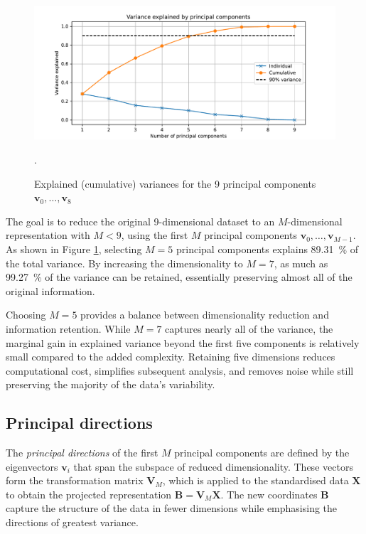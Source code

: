 \documentclass[dtu]{dtuarticle}
\begin{document}
	\begin{figure}[h!]
		\includegraphics[width=.9\textwidth]{figures/pca_explained_variance}
		\caption{Explained (cumulative) variances for the 9 principal components $\bm{v}_0,\ldots,\bm{v}_8$}.
		\label{fig:explained-var}
	\end{figure}

	The goal is to reduce the original 9-dimensional dataset to an $M$-dimensional representation with $M < 9$, using the first $M$ principal components $\bm{v}_0,\ldots,\bm{v}_{M-1}$. As shown in Figure \ref{fig:explained-var}, selecting $M=5$ principal components explains \SI{89.31}{\percent} of the total variance. By increasing the dimensionality to $M=7$, as much as \SI{99.27}{\percent} of the variance can be retained, essentially preserving almost all of the original information.

	Choosing $M=5$ provides a balance between dimensionality reduction and information retention. While $M=7$ captures nearly all of the variance, the marginal gain in explained variance beyond the first five components is relatively small compared to the added complexity. Retaining five dimensions reduces computational cost, simplifies subsequent analysis, and removes noise while still preserving the majority of the data's variability.

	\subsection{Principal directions}

	The \textit{principal directions} of the first $M$ principal components are defined by the eigenvectors $\bm{v}_i$ that span the subspace of reduced dimensionality. These vectors form the transformation matrix $\bm{V}_M$, which is applied to the standardised data $\bm{X}$ to obtain the projected representation $\bm{B} = \bm{V}_M \bm{X}$. The new coordinates $\bm{B}$ capture the structure of the data in fewer dimensions while emphasising the directions of greatest variance.
\end{document}
